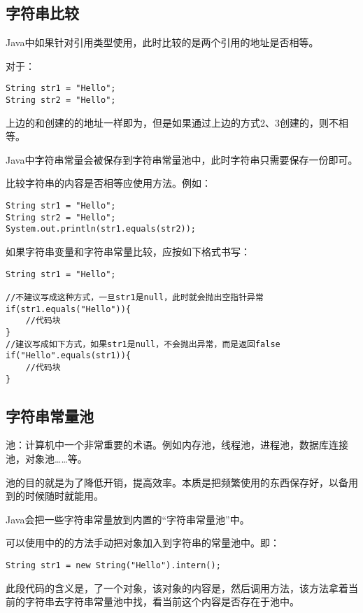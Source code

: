 \documentclass[a4paper]{report}
\begin{document}
\subsection{字符串比较}
Java中如果针对引用类型使用\dm{==}，此时比较的是两个引用的地址是否相等。

对于：
\begin{lstlisting}[title=字符串比较1]
String str1 = "Hello";
String str2 = "Hello";
\end{lstlisting}
上边的和创建的的地址一样即为，但是如果通过上边的方式2、3创建的，则不相等。

Java中字符串常量会被保存到字符串常量池中，此时字符串只需要保存一份即可。


比较字符串的内容是否相等应使用方法。例如：
\begin{lstlisting}[title=字符串比较2]
String str1 = "Hello";
String str2 = "Hello";
System.out.println(str1.equals(str2));
\end{lstlisting}

如果字符串变量和字符串常量比较，应按如下格式书写：
\begin{lstlisting}[title=字符串比较3]
String str1 = "Hello";

//不建议写成这种方式，一旦str1是null，此时就会抛出空指针异常
if(str1.equals("Hello")){
    //代码块
}
//建议写成如下方式，如果str1是null，不会抛出异常，而是返回false
if("Hello".equals(str1)){
    //代码块
}
\end{lstlisting}

\subsection{字符串常量池}
池：计算机中一个非常重要的术语。例如内存池，线程池，进程池，数据库连接池，对象池……等。

池的目的就是为了降低开销，提高效率。本质是把频繁使用的东西保存好，以备用到的时候随时就能用。

Java会把一些字符串常量放到内置的“字符串常量池”中。

可以使用中的的方法手动把对象加入到字符串的常量池中。即：
\begin{lstlisting}[title=加入字符串到常量池]
String str1 = new String("Hello").intern();
\end{lstlisting}
此段代码的含义是，了一个对象，该对象的内容是，然后调用方法，该方法拿着当前的字符串去字符串常量池中找，看当前这个内容是否存在于池中。
\end{document}
